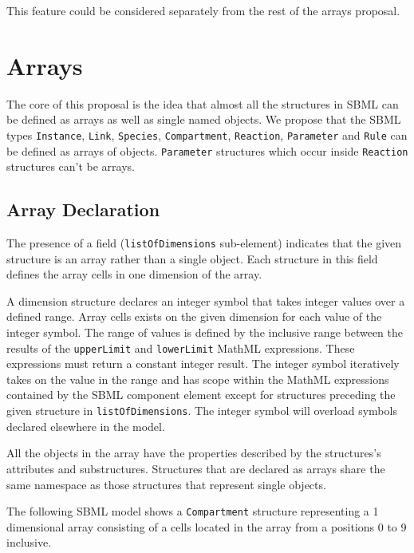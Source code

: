 \documentclass{cekarticle}
\begin{document}
This feature could be considered separately from the rest of the arrays proposal.

\section{Arrays}
\label{sec:arrays}

The core of this proposal is the idea that almost all the
structures in SBML can be defined as arrays as well as single
named objects.  We propose that the SBML types
\texttt{Instance}, \texttt{Link}, \texttt{Species}, \texttt{Compartment}, \texttt{Reaction},
\texttt{Parameter} and \texttt{Rule} can be defined as arrays of
objects. \texttt{Parameter} structures which occur inside \texttt{Reaction} structures can't
be arrays.

\subsection{Array Declaration}
\label{sec:arraydec}
The presence of a  field
(\texttt{listOfDimensions} sub-element) indicates that the given
structure is an array rather than a single object.  Each  structure in this field defines
the array cells in one dimension of the array.

A dimension structure declares an integer symbol that takes integer values over a defined range.  
Array cells exists on the given dimension for each value of the integer symbol.  The range of values
is defined by the inclusive range between the results of the \texttt{upperLimit} and \texttt{lowerLimit}
MathML expressions.  These expressions must return a constant integer result.  The integer symbol iteratively takes on the
value in the range and has scope within the MathML expressions contained by the SBML component element
except for  structures preceding the given  structure in \texttt{listOfDimensions}.
The integer symbol will overload symbols declared elsewhere in the model.

All the objects in the
array have the properties described by the structures's
attributes and substructures.
Structures that are declared as arrays share the same namespace
as those structures that represent single objects.

The following SBML model shows a \texttt{Compartment}
structure representing a 1 dimensional array consisting of
a cells located in the array from a positions 0 to 9 inclusive.
\end{document}
